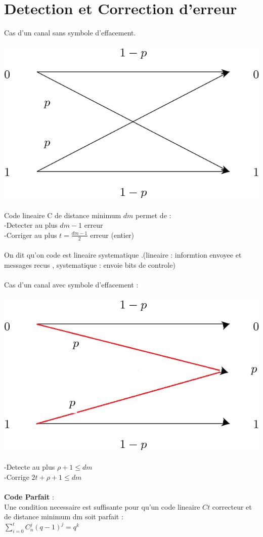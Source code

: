 \documentclass[a4paper,8pt,openany]{book}
\begin{document}
\section{Detection et Correction d'erreur}
Cas d'un canal sans symbole d'effacement.\\
\\
\includegraphics[width=0.5\linewidth]{img/sans_effacement.png}\\
\\
Code lineaire C de distance minimum $dm$ permet de :\\
-Detecter au plus $dm-1$ erreur\\
-Corriger au plus $t=\frac{dm-1}{2}$ erreur (entier)\\
\\
On dit qu'on code est lineaire systematique .(lineaire : informtion envoyee et messages recus , systematique : envoie bits de controle)\\
\\
Cas d'un canal avec symbole d'effacement : \\
\\
\includegraphics[width=0.5\linewidth]{img/avec_effacement.png}\\
\\
-Detecte au plus $\rho +1 \leq dm$ \\
-Corrige $2t+\rho +1 \leq dm$ \\
\\

\textbf{Code Parfait} : \\
Une condition necessaire est suffisante pour qu'un code lineaire $Ct$ correcteur et de distance minimum dm soit parfait : \\
$\sum\limits_{i=0}^t C_n^j(q-1)^j = q^k$\\
\\
\end{document}
